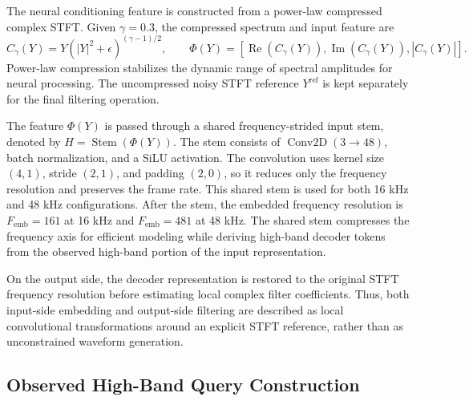 The neural conditioning feature is constructed from a power-law compressed complex STFT. Given \(\gamma=0.3\), the compressed spectrum and input feature are
\begin{equation}
    C_{\gamma}(Y)
    =
    Y\left(|Y|^2+\epsilon\right)^{(\gamma-1)/2},
    \qquad
    \Phi(Y)=
    \left[
    \operatorname{Re}(C_{\gamma}(Y)),
    \operatorname{Im}(C_{\gamma}(Y)),
    |C_{\gamma}(Y)|
    \right].
\end{equation}
Power-law compression stabilizes the dynamic range of spectral amplitudes for neural processing. The uncompressed noisy STFT reference \(Y^{\mathrm{ref}}\) is kept separately for the final filtering operation.

The feature \(\Phi(Y)\) is passed through a shared frequency-strided input stem, denoted by \(H=\operatorname{Stem}(\Phi(Y))\). The stem consists of \(\operatorname{Conv2D}(3 \rightarrow 48)\), batch normalization, and a SiLU activation. The convolution uses kernel size \((4,1)\), stride \((2,1)\), and padding \((2,0)\), so it reduces only the frequency resolution and preserves the frame rate. This shared stem is used for both 16 kHz and 48 kHz configurations. After the stem, the embedded frequency resolution is \(F_{\mathrm{emb}}=161\) at 16 kHz and \(F_{\mathrm{emb}}=481\) at 48 kHz. The shared stem compresses the frequency axis for efficient modeling while deriving high-band decoder tokens from the observed high-band portion of the input representation.

On the output side, the decoder representation is restored to the original STFT frequency resolution before estimating local complex filter coefficients. Thus, both input-side embedding and output-side filtering are described as local convolutional transformations around an explicit STFT reference, rather than as unconstrained waveform generation.

\subsection{Observed High-Band Query Construction}
\label{sec:method_query_refinement}

